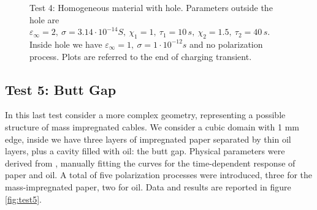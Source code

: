 \documentclass[11pt,a4paper]{article}
\begin{document}
\begin{figure}
{	}
	\caption{Test 4: Homogeneous material with hole. Parameters outside the hole are \(\varepsilon_\infty = 2,\ \sigma = 3.14\cdot 10^{-14}S,\ \chi_1 = 1,\ \tau_1 = 10\,s,\ \chi_2 = 1.5,\ \tau_2 = 40\,s\). Inside hole we have \(\varepsilon_\infty = 1,\ \sigma = 1\cdot 10^{-12}s\) and no polarization process. Plots are referred to the end of charging transient.}
	\label{fig:test4}
	
\end{figure}

\subsection{Test 5: Butt Gap}
In this last test consider a more complex geometry, representing a possible structure of mass impregnated cables. We consider a cubic domain with 1 mm edge, inside we have three layers of impregnated paper separated by thin oil layers, plus a cavity filled with oil: the butt gap. Physical parameters were derived from \cite{hakonseththesis}, manually fitting the curves for the time-dependent response of paper and oil. A total of five polarization processes were introduced, three for the mass-impregnated paper, two for oil.
Data and results are reported in figure \ref{fig:test5}.
\end{document}
